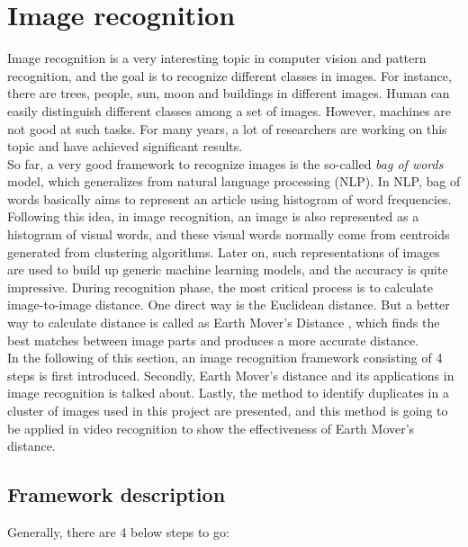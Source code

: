 \section {Image recognition}
Image recognition is a very interesting topic in computer vision and pattern recognition, and the goal is to recognize different classes in images. For instance, there are trees, people, sun, moon and buildings in different images. Human can easily distinguish different classes among a set of images. However, machines are not good at such tasks. For many years, a lot of researchers are working on this topic and have achieved significant results.\\

\noindent So far, a very good framework to recognize images is the so-called {\em bag of words} model, which generalizes from natural language processing (NLP). In NLP, bag of words basically aims to represent an article using histogram of word frequencies. Following this idea, in image recognition, an image is also represented as a histogram of visual words, and these visual words normally come from centroids generated from clustering algorithms. Later on, such representations of images are used to build up generic machine learning models, and the accuracy is quite impressive. During recognition phase, the most critical process is to calculate image-to-image distance. One direct way is the Euclidean distance. But a better way to calculate distance is called as Earth Mover's Distance \cite{rubner2000earth}, which finds the best matches between image parts and produces a more accurate distance. \\

\noindent In the following of this section, an image recognition framework consisting of 4 steps is first introduced. Secondly, Earth Mover's distance and its applications in image recognition is talked about. Lastly, the method to identify duplicates in a cluster of images used in this project are presented, and this method is going to be applied in video recognition to show the effectiveness of Earth Mover's distance.

\subsection{Framework description}

Generally, there are 4 below steps to go:

